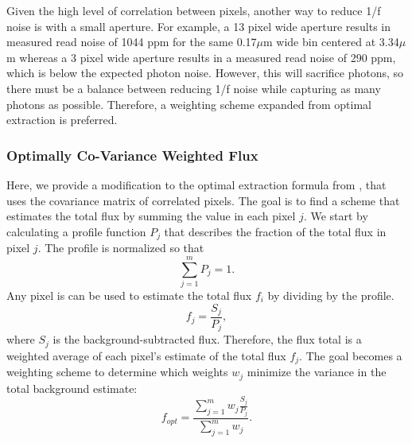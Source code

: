 \documentclass[]{aastex62}
\begin{document}
Given the high level of correlation between pixels, another way to reduce 1/f noise is with a small aperture.
For example, a 13 pixel wide aperture results in measured read noise of 1044 ppm for the same 0.17$\mu$m wide bin centered at 3.34$\mu$m whereas a 3 pixel wide aperture results in a measured read noise of 290 ppm, which is below the expected photon noise.
However, this will sacrifice photons, so there must be a balance between reducing 1/f noise while capturing as many photons as possible.
Therefore, a weighting scheme expanded from optimal extraction \citep{horne1986optimalE} is preferred.

\subsubsection{Optimally Co-Variance Weighted Flux}\label{sec:optimalCovWeights}

Here, we provide a modification to the optimal extraction formula from \citet{horne1986optimalE}, that uses the covariance matrix of correlated pixels.
The goal is to find a scheme that estimates the total flux by summing the value in each pixel $j$.
We start by calculating a profile function $P_j$ that describes the fraction of the total flux in pixel $j$.
The profile is normalized so that
\begin{equation*}
\sum_{j=1}^{m} P_j = 1.
\end{equation*}
Any pixel is can be used to estimate the total flux $f_i$ by dividing by the profile.
\begin{equation*}
f_j = \frac{S_j}{P_j},
\end{equation*}
where $S_j$ is the background-subtracted flux.
Therefore, the flux total is a weighted average of each pixel's estimate of the total flux $f_j$.
The goal becomes a weighting scheme to determine which weights $w_j$ minimize the variance in the total background estimate:
\begin{equation*}
f_{opt} = \frac{\sum_{j=1}^{m} w_j \frac{S_j}{P_j}}{\sum_{j=1}^{m} w_j}.
\end{equation*}
\end{document}
